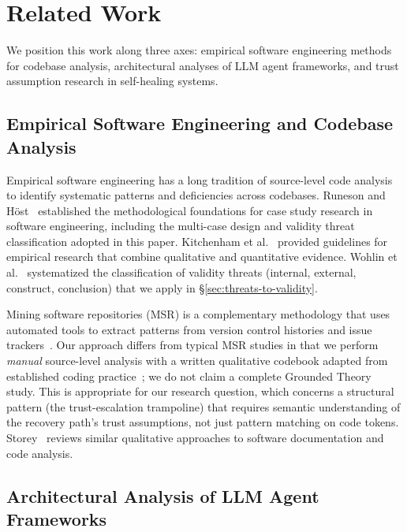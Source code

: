
\section{Related Work}
\label{sec:related-work}

We position this work along three axes: empirical software engineering methods for codebase analysis, architectural analyses of LLM agent frameworks, and trust assumption research in self-healing systems.

\subsection{Empirical Software Engineering and Codebase Analysis}

Empirical software engineering has a long tradition of source-level code analysis to identify systematic patterns and deficiencies across codebases. Runeson and H{\"o}st~\cite{runeson2009} established the methodological foundations for case study research in software engineering, including the multi-case design and validity threat classification adopted in this paper. Kitchenham et al.~\cite{kitchenham2002} provided guidelines for empirical research that combine qualitative and quantitative evidence. Wohlin et al.~\cite{wohlin2012} systematized the classification of validity threats (internal, external, construct, conclusion) that we apply in \S\ref{sec:threats-to-validity}.

Mining software repositories (MSR) is a complementary methodology that uses automated tools to extract patterns from version control histories and issue trackers~\cite{bird2015}. Our approach differs from typical MSR studies in that we perform \emph{manual} source-level analysis with a written qualitative codebook adapted from established coding practice~\cite{glaser1967,strauss1998}; we do not claim a complete Grounded Theory study. This is appropriate for our research question, which concerns a structural pattern (the trust-escalation trampoline) that requires semantic understanding of the recovery path's trust assumptions, not just pattern matching on code tokens. Storey~\cite{storey2008} reviews similar qualitative approaches to software documentation and code analysis.

\subsection{Architectural Analysis of LLM Agent Frameworks}

